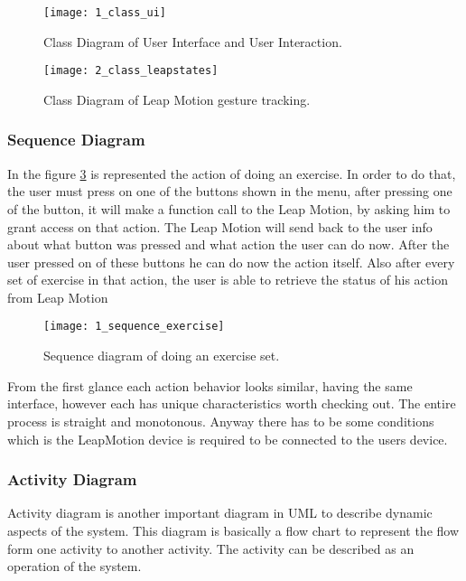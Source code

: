 \vspace{0.2cm}



\begin{figure}[!h]
\centering
\texttt{[image: 1\_class\_ui]}
\caption{Class Diagram of User Interface and User Interaction.}\label{class_ui}
\end{figure}

\clearpage

\begin{figure}[!h]
\centering
\texttt{[image: 2\_class\_leapstates]}
\caption{Class Diagram of Leap Motion gesture tracking.}\label{class_leap}
\end{figure}

\clearpage

\subsubsection{Sequence Diagram}
In the \mbox{figure} \ref{sequence_exercise} is represented the action of doing an exercise. In order to do that, the user must press on one of the buttons shown in the menu, after pressing one of the button, it will make a function call to the Leap Motion, by asking him to grant access on that action. The Leap Motion will send back to the user info about what button was pressed and what action the user can do now. After the user pressed on of these buttons he can do now the action itself. Also after every set of exercise in that action, the user is able to retrieve the status of his action from Leap Motion 

\begin{figure}[!h]
\centering
\texttt{[image: 1\_sequence\_exercise]}
\caption{Sequence diagram of doing an exercise set.}\label{sequence_exercise}
\end{figure}
From the first glance each action behavior looks similar, having the same interface, however each has unique characteristics worth checking out. The entire process is straight and monotonous. Anyway there has to be some conditions which is the LeapMotion device is required to be connected to the users device.
\clearpage

\subsubsection{Activity Diagram}
Activity diagram is another important diagram in UML to describe dynamic aspects of the system. This diagram is basically a flow chart to represent the flow form one activity to another activity. The activity can be described as an operation of the system.

